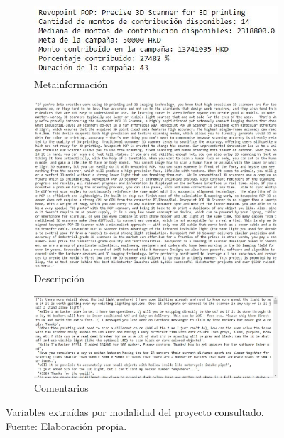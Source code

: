 \begin{figure}[!ht]
	\centering
	\small
	\begin{subfigure}{1.0\textwidth}
		\centering
		\includegraphics[width=0.75\linewidth]{4/figures/metadata_scraped_project.jpg}
		\caption{Metainformación}
	\end{subfigure}
	\begin{subfigure}{.50\textwidth}
		\centering
		\includegraphics[width=0.95\linewidth]{4/figures/description_scraped_project.jpg}
		\caption{Descripción}
	\end{subfigure}%
	\begin{subfigure}{.50\textwidth}
		\centering
		\includegraphics[width=0.95\linewidth]{4/figures/comments_scraped_project.jpg}
		\caption{Comentarios}
	\end{subfigure}
	\caption[Variables extraídas por modalidad del proyecto consultado]{Variables extraídas por modalidad del proyecto consultado.\\
		Fuente: Elaboración propia.}
	\label{4:fig40}
\end{figure}

